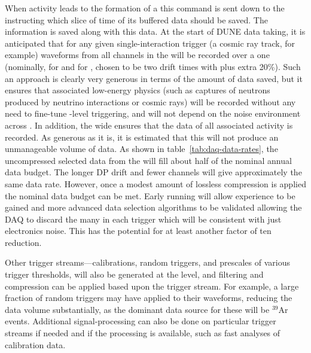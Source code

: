 When activity leads to the formation of a  this
command is sent down to the  instructing which slice of
time of its buffered data should be saved. 
The  information is saved along with this data. 
At the start of DUNE data taking, it is anticipated that for any given
single-interaction trigger (a cosmic ray track, for example) waveforms
from all channels in the  will be recorded over a one
 (nominally, \spreadout for  and
\dpreadout for , chosen to be two drift times with plus
extra 20\%). 
Such an approach is clearly very generous in terms of the amount of
data saved, but it ensures that associated low-energy physics (such as
captures of neutrons produced by neutrino interactions or cosmic rays)
will be recorded without any need to fine-tune -level
triggering, and will not depend on the noise environment across
. 
In addition, the wide  ensures that the data of
all associated activity is recorded.
As generous as it is, it is estimated that this 
will not produce an unmanageable volume of data.
As shown in table~\ref{tab:daq-data-rates}, the uncompressed selected
data from the   will fill about half of the
nominal annual data budget. 
The longer DP drift and fewer channels will give approximately the
same data rate. 
However, once a modest amount of lossless compression is applied the
nominal data budget can be met. 
Early running will allow experience to be gained and more advanced
data selection algorithms to be validated allowing the DAQ to discard
the many  in each trigger which will be consistent
with just electronics noise. 
This has the potential for at least another factor of ten reduction.

Other trigger streams---calibrations, random triggers, and prescales
of various trigger thresholds, will also be generated at the
 level, and filtering and compression can be applied
based upon the trigger stream. 
For example, a large fraction of random triggers may have 
applied to their waveforms, reducing the data volume substantially, as
the dominant data source for these will be $^{39}$Ar events.
Additional signal-processing can also be done on particular trigger
streams if needed and if the processing is available, such as fast
analyses of calibration data.

